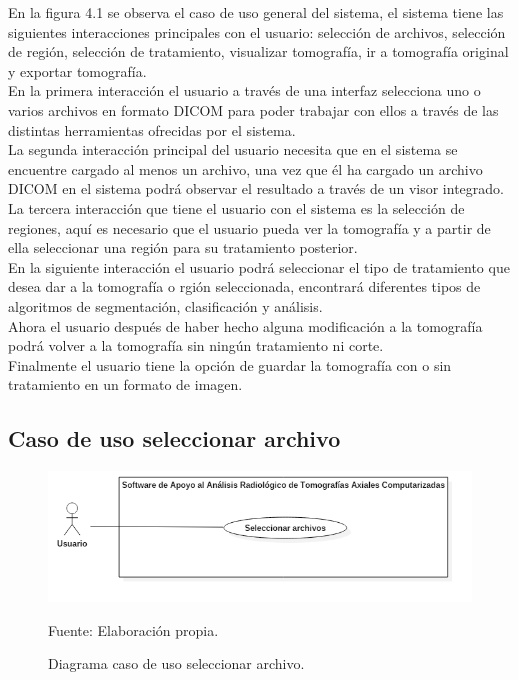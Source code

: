 \documentclass[12pt]{report}
\begin{document}
En la figura 4.1 se observa el caso de uso general del sistema, el sistema tiene  las siguientes interacciones principales con el usuario: selección de archivos, selección de región, selección de tratamiento, visualizar tomografía, ir a tomografía original y exportar tomografía.\\ 

En la primera interacción el usuario a través de una interfaz selecciona uno o varios archivos en formato DICOM para poder trabajar con ellos a través de las distintas herramientas ofrecidas por el sistema.\\

La segunda interacción principal del usuario necesita que en el sistema se encuentre cargado al menos un archivo, una vez que él ha cargado un archivo DICOM en el sistema podrá observar el resultado a través de un visor integrado.\\ 

La tercera interacción que tiene el usuario con el sistema es la selección de regiones, aquí es necesario que el usuario pueda ver la tomografía y a partir de ella seleccionar una región para su tratamiento posterior.\\

En la siguiente interacción el usuario podrá seleccionar el tipo de tratamiento que desea dar a la tomografía o rgión seleccionada, encontrará diferentes tipos de algoritmos de segmentación, clasificación y análisis.\\

Ahora el usuario después de haber hecho alguna modificación a la tomografía podrá volver a la tomografía sin ningún tratamiento ni corte.\\

Finalmente el usuario tiene la opción de guardar la tomografía con o sin tratamiento en un formato de imagen.


\subsection{Caso de uso seleccionar archivo}
\begin{figure}[H]
\centering
\includegraphics[width = 9 cm, height =  7 cm]{ArchivoCasos}
\caption{Diagrama caso de uso seleccionar archivo.}
Fuente: Elaboración propia.
\end{figure}
\end{document}
